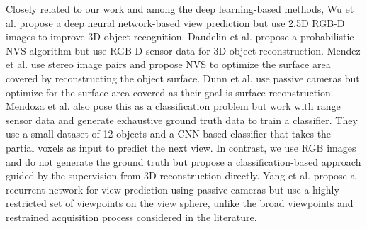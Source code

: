 Closely related to our work and among the deep learning-based methods, Wu et al. \cite{wu20153d} propose a deep neural network-based view prediction but use 2.5D RGB-D images to improve 3D object recognition.
Daudelin et al. \cite{daudelin2017adaptable} propose a probabilistic NVS algorithm but use RGB-D sensor data for 3D object reconstruction.
Mendez et al. \cite{mendez2016next} use stereo image pairs and propose NVS to optimize the surface area covered by reconstructing the object surface.
Dunn et al. \cite{dunn2009next} use passive cameras but optimize for the surface area covered as their goal is surface reconstruction.
Mendoza et al. \cite{mendoza2020supervised} also pose this as a classification problem but work with range sensor data and generate exhaustive ground truth data to train a classifier.
They use a small dataset of 12 objects and a CNN-based classifier that takes the partial voxels as input to predict the next view. 
In contrast, we use RGB images and do not generate the ground truth but propose a classification-based approach guided by the supervision from 3D reconstruction directly.
Yang et al. \cite{yang2018active} propose a recurrent network for view prediction using passive cameras but use a highly restricted set of viewpoints on the view sphere, unlike the broad viewpoints and restrained acquisition process considered in the literature.